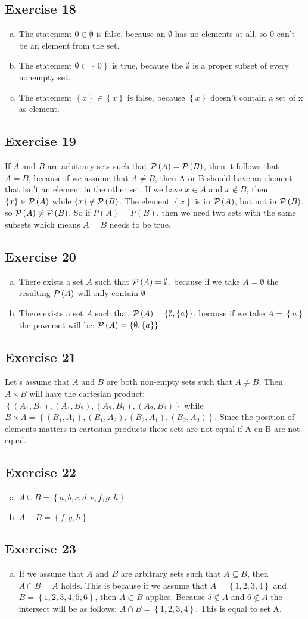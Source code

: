 \documentclass[a4paper]{article}
\newcommand{\exercise}[2]{\subsection*{Exercise #1}{#2}}
\newcommand{\exerciseenum}[2]{\subsection*{Exercise #1}{\begin{enumerate}[a)]#2\end{enumerate}}}
\newcommand{\set}[1]{\ensuremath{\left\{{#1}\right\}}}
\newcommand{\power}[1]{\ensuremath{{\cal P}\left({#1}\right)}}
\begin{document}
\exerciseenum{18}{%
\item%
The statement
$0 \in \emptyset$
is false,
because an $\emptyset$ has no elements at all, so 0 can't be an element from the set.

\addtocounter{enumi}{2}
\item%
The statement
$\emptyset\subset \set{0}$
is true,
because the $\emptyset$ is a proper subset of every nonempty set.

\addtocounter{enumi}{2}
\item%
The statement
$\set{x}\in\set{x}$
is false,
because $\set{x}$ doesn't contain a set of x as element.
}

\exercise{19}{%
If $A$ and $B$ are arbitrary sets such that $\power{A}=\power{B}$,
then it
follows
that $A=B$,
because if we assume that $A \neq B$, then A or B should have an element that isn't an element in the other set. If we have $x \in A$ and $x \notin B$, then $\set{x} \in \power{A}$ while $\set{x} \notin \power{B}$. The element $\set{x}$ is in $\power{A}$, but not in $\power{B}$, so $\power{A} \neq \power{B}$. So if $P(A) = P(B)$, then we need two sets with the same subsets which means $A = B$ needs to be true.
}

\exerciseenum{20}{%
\item%
There
exists
a set $A$ such that $\power{A}=\emptyset$,
because if we take $A = \emptyset$ the resulting $\power{A}$ will only contain $\emptyset$
\item%
There
exists
a set $A$ such that $\power{A}=\set{\emptyset, \set{a}}$,
because if we take $A = \set{a}$ the powerset will be: $\power{A} = \set{\emptyset, \set{a}}$.
}

\exercise{21}{%
Let's assume that $A$ and $B$ are both non-empty sets such that $A\neq B$.
Then $A \times B$ will have the cartesian product: $\set{(A_1, B_1), (A_1, B_2), (A_2, B_1), (A_2, B_2)}$ while $B \times A = \set{(B_1, A_1), (B_1, A_2), (B_2, A_1), (B_2, A_2)}$. Since the position of elements matters in cartesian products these sets are not equal if A en B are not equal.
}

\exerciseenum{22}{%
\item%
$A\cup B = \set{a, b, c, d, e, f, g, h}$

\addtocounter{enumi}{2}
\item%
$A - B = \set{f, g, h}$
}

\exerciseenum{23}{%
\addtocounter{enumi}{1}
\item%
If we assume that $A$ and $B$ are arbitrary sets such that $A\subseteq B$,
then $A\cap B = A$ holds.
This is because if we assume that $A = \set{1, 2, 3, 4}$ and $B = \set{1, 2, 3, 4, 5, 6}$, then $A \subset B$ applies. Because $5 \notin A$ and $6 \notin A$ the intersect will be as follows: $A \cap B = \set{1, 2, 3, 4}$. This is equal to set A.
}
\end{document}
